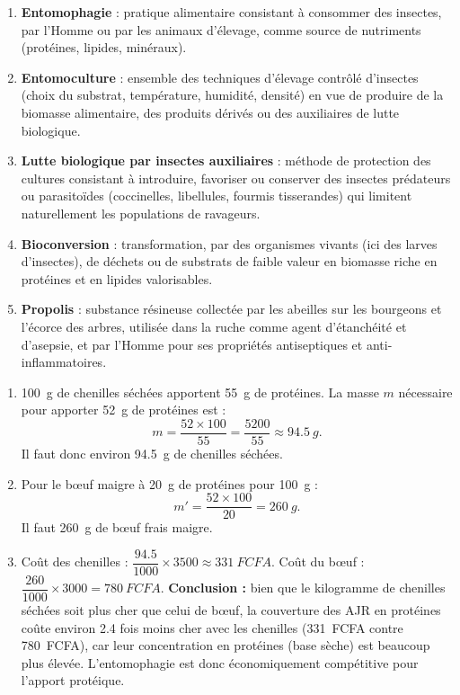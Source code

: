 \documentclass[11pt]{article}
\begin{document}
\begin{corrige}
\begin{enumerate}
\item \textbf{Entomophagie} : pratique alimentaire consistant à consommer des insectes, par l'Homme ou par les animaux d'élevage, comme source de nutriments (protéines, lipides, minéraux).
\item \textbf{Entomoculture} : ensemble des techniques d'élevage contrôlé d'insectes (choix du substrat, température, humidité, densité) en vue de produire de la biomasse alimentaire, des produits dérivés ou des auxiliaires de lutte biologique.
\item \textbf{Lutte biologique par insectes auxiliaires} : méthode de protection des cultures consistant à introduire, favoriser ou conserver des insectes prédateurs ou parasitoïdes (coccinelles, libellules, fourmis tisserandes) qui limitent naturellement les populations de ravageurs.
\item \textbf{Bioconversion} : transformation, par des organismes vivants (ici des larves d'insectes), de déchets ou de substrats de faible valeur en biomasse riche en protéines et en lipides valorisables.
\item \textbf{Propolis} : substance résineuse collectée par les abeilles sur les bourgeons et l'écorce des arbres, utilisée dans la ruche comme agent d'étanchéité et d'asepsie, et par l'Homme pour ses propriétés antiseptiques et anti-inflammatoires.
\end{enumerate}
\end{corrige}

\begin{corrige}
\begin{enumerate}
\item \SI{100}{g} de chenilles séchées apportent \SI{55}{g} de protéines. La masse $m$ nécessaire pour apporter \SI{52}{g} de protéines est :
\[ m = \frac{52 \times 100}{55} = \frac{5200}{55} \approx \SI{94,5}{g}. \]
Il faut donc environ \SI{94,5}{g} de chenilles séchées.
\item Pour le bœuf maigre à \SI{20}{g} de protéines pour \SI{100}{g} :
\[ m' = \frac{52 \times 100}{20} = \SI{260}{g}. \]
Il faut \SI{260}{g} de bœuf frais maigre.
\item Coût des chenilles : $\dfrac{\num{94,5}}{1000} \times 3500 \approx \SI{331}{FCFA}$. Coût du bœuf : $\dfrac{260}{1000} \times 3000 = \SI{780}{FCFA}$.
\textbf{Conclusion :} bien que le kilogramme de chenilles séchées soit plus cher que celui de bœuf, la couverture des AJR en protéines coûte environ \num{2,4} fois moins cher avec les chenilles (\SI{331}{FCFA} contre \SI{780}{FCFA}), car leur concentration en protéines (base sèche) est beaucoup plus élevée. L'entomophagie est donc économiquement compétitive pour l'apport protéique.
\end{enumerate}
\end{corrige}
\end{document}
